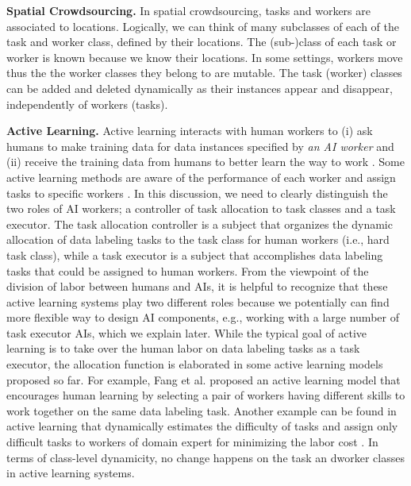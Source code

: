

\noindent
{\bf Spatial Crowdsourcing.}
In spatial crowdsourcing, tasks and workers are associated to locations. 
Logically, we can think of many subclasses of each of the task and worker class, defined by their locations.
The (sub-)class of each task or worker is known because we know their locations. 
In some settings, workers move thus the the worker classes they belong to are mutable.
The task (worker) classes can be added and deleted dynamically as their instances appear and disappear, independently of workers (tasks).


\noindent
{\bf Active Learning.}
Active learning interacts with human workers to (i) ask humans to make training data for data instances specified by {\it an AI worker} and (ii) receive the training data from humans to better learn the way to work \cite{Set09}.
Some active learning methods are aware of the performance of each worker and assign tasks to specific workers \cite{RPR14,YRF+11}.
In this discussion, we need to clearly distinguish the two roles of AI workers;  a controller of task allocation to task classes and a task executor.
The task allocation controller is a subject that organizes the dynamic allocation of data labeling tasks to the task class for human workers (i.e., hard task class), while a task executor is a subject that accomplishes data labeling tasks that could be assigned to human workers.
From the viewpoint of the division of labor between humans and AIs, it is helpful to recognize that these active learning systems play two different roles because we potentially can find more flexible way to design AI components, e.g., working with a large number of task executor AIs, which we explain later.
While the typical goal of active learning is to take over the human labor on data labeling tasks as a task executor, the allocation function is elaborated in some active learning models proposed so far.
For example, Fang et al. \cite{FZL+12} proposed an active learning model that encourages human learning by selecting a pair of workers having different skills to work together on the same data labeling task.
Another example can be found in active learning that dynamically estimates the difficulty of tasks and assign only difficult tasks to workers of domain expert for minimizing the labor cost \cite{HHM+15,NWL15,ZC15}.
In terms of class-level dynamicity, no change happens on the task an dworker classes in  active learning systems.

